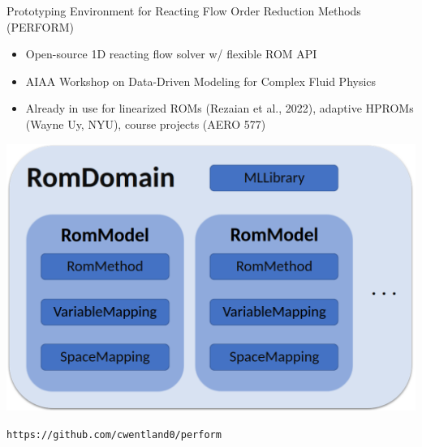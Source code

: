 \documentclass[]{beamer}
\begin{document}

\begin{frame}{\footnotesize{Prototyping Environment for Reacting Flow Order Reduction Methods (PERFORM)\footnotemark[15]}}
	\begin{itemize}
		\small
		\item Open-source 1D reacting flow solver w/ flexible ROM API
		\item AIAA Workshop on Data-Driven Modeling for Complex Fluid Physics
		\item Already in use for linearized ROMs (Rezaian et al., 2022), adaptive HPROMs (Wayne Uy, NYU), course projects (AERO 577)
		\normalsize
	\end{itemize}
	\vspace{0.5em}
	\begin{minipage}{0.4\linewidth}
		\includegraphics[width=0.99\linewidth]{misc/performAPI.png}
	\end{minipage}
	\begin{minipage}{0.59\linewidth}
	\end{minipage}

	\vspace{1em}
	\centering
	\texttt{https://github.com/cwentland0/perform}
\end{frame}
\end{document}
